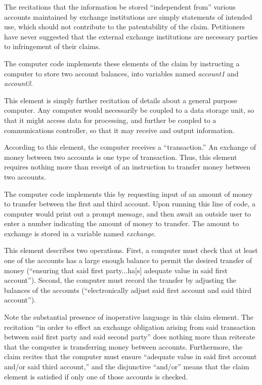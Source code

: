 \documentclass{scotus}
\begin{document}
The recitations that the information be stored ``independent from'' various
accounts maintained by exchange institutions are simply statements of intended
use, which should not contribute to the patentability of the claim. Petitioners
have never suggested that the external exchange institutions are necessary
parties to infringement of their claims.

The computer code implements these elements of the claim by instructing a
computer to store two account balances, into variables named \emph{account1} and
\emph{account3}.


This element is simply further recitation of details about a general purpose
computer. Any computer would necessarily be coupled to a data storage unit, so
that it might access data for processing, and further be coupled to a
communications controller, so that it may receive and output information.


According to this element, the computer receives a ``transaction.'' An exchange
of money between two accounts is one type of transaction. Thus, this element
requires nothing more than receipt of an instruction to transfer money between
two accounts.

The computer code implements this by requesting input of an amount of money to
transfer between the first and third account. Upon running this line of code,
a computer would print out a prompt message, and then await an outside user to
enter a number indicating the amount of money to transfer. The amount to
exchange is stored in a variable named \emph{exchange}.


This element describes two operations. First, a computer must check that at
least one of the accounts has a large enough balance to permit the desired
transfer of money (``ensuring that said first party...ha[s] adequate value in
said first account''). Second, the computer must record the transfer by
adjusting the balances of the accounts (``electronically adjust said first
account and said third account'').

Note the substantial presence of inoperative language in this claim element. The
recitation ``in order to effect an exchange obligation arising from said
transaction between said first party and said second party'' does nothing more
than reiterate that the computer is transferring money between accounts.
Furthermore, the claim recites that the computer must ensure ``adequate value in
said first account and/or said third account,'' and the disjunctive ``and/or''
means that the claim element is satisfied if only one of those accounts is
checked.
\end{document}
